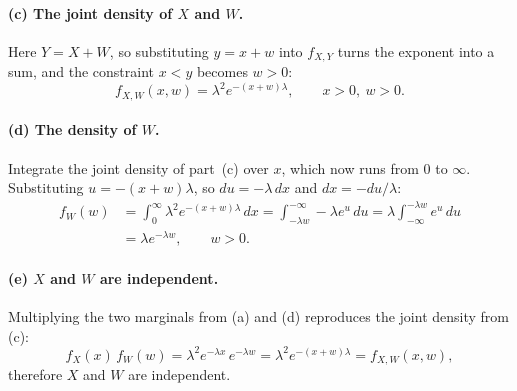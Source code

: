 \documentclass[11pt]{article}
\begin{document}
\paragraph{(c) The joint density of $X$ and $W$.}
Here $Y = X + W$, so substituting $y = x + w$ into $f_{X,Y}$ turns the exponent into a
sum, and the constraint $x < y$ becomes $w > 0$:
\[
  f_{X,W}(x,w) = \boxed{\lambda^{2} e^{-(x+w)\lambda}}, \qquad x > 0,\ w > 0 .
\]

\paragraph{(d) The density of $W$.}
Integrate the joint density of part~(c) over $x$, which now runs from $0$ to $\infty$.
Substituting $u = -(x+w)\lambda$, so $du = -\lambda\,dx$ and $dx = -du/\lambda$:
\begin{align*}
  f_{W}(w) &= \int_{0}^{\infty} \lambda^{2} e^{-(x+w)\lambda}\,dx
            = \int_{-\lambda w}^{-\infty} -\lambda e^{u}\,du
            = \lambda \int_{-\infty}^{-\lambda w} e^{u}\,du\\
           &= \boxed{\lambda e^{-\lambda w}}, \qquad w > 0 .
\end{align*}
\paragraph{(e) $X$ and $W$ are independent.}
Multiplying the two marginals from (a) and (d) reproduces the joint density from (c):
\[
  f_{X}(x)\,f_{W}(w) = \lambda^{2} e^{-\lambda x}\,e^{-\lambda w}
                     = \lambda^{2} e^{-(x+w)\lambda}
                     = f_{X,W}(x,w),
\]
therefore $X$ and $W$ are independent.
\end{document}
